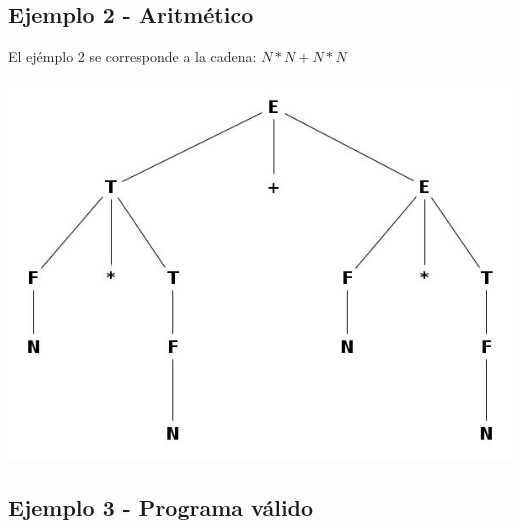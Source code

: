 \subsection{Ejemplo 2 - Aritm\'etico}
El ej\'emplo 2 se corresponde a la cadena:
$N*N+N*N$
\centerline{\includegraphics[scale=0.40]{arboles_derivacion/ejemplo2.jpg}}


\subsection{Ejemplo 3 - Programa v\'alido}

